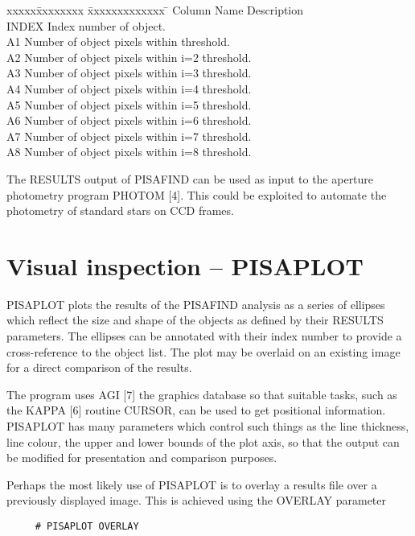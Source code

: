 \begin{center}
\begin{tabbing}
xxxxx\=xxxxxxxx \= xxxxxxxxxxxxx \= \kill
\>Column \> Name  \> Description \\
 \> INDEX \> Index number of object.\\
 \> A1 \> Number of object pixels within threshold.\\
 \> A2 \> Number of object pixels within i=2 threshold.\\
 \> A3 \> Number of object pixels within i=3 threshold.\\
 \> A4 \> Number of object pixels within i=4 threshold.\\
 \> A5 \> Number of object pixels within i=5 threshold.\\
 \> A6 \> Number of object pixels within i=6 threshold.\\
 \> A7 \> Number of object pixels within i=7 threshold.\\
 \> A8 \> Number of object pixels within i=8 threshold.\\
\end{tabbing}
\end{center}

The RESULTS output of PISAFIND can be used as input to the aperture
photometry program PHOTOM [4]. This could be exploited to automate the
photometry of standard stars on CCD frames.

\section{Visual inspection -- PISAPLOT}

PISAPLOT plots the results of the PISAFIND analysis as a series of
ellipses which reflect the size and shape of the objects as defined by
their RESULTS parameters. The ellipses can be annotated with their index
number to provide a cross-reference to the object list. The plot may be
overlaid on an existing image for a direct comparison of the results.

The program uses AGI [7] the graphics database so that suitable tasks,
such as the KAPPA [6] routine CURSOR, can be used to get positional
information. PISAPLOT has many parameters which control such things as
the line thickness, line colour, the upper and lower bounds of the plot
axis, so that the output can be modified for presentation and comparison
purposes.

Perhaps the most likely use of PISAPLOT is to overlay a results file
over a previously displayed image. This is achieved using the OVERLAY
parameter
\begin{verbatim}
     # PISAPLOT OVERLAY
\end{verbatim}

